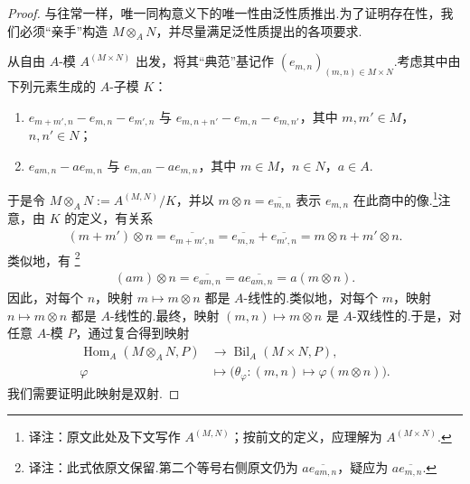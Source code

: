 \begin{proof}
与往常一样，唯一同构意义下的唯一性由泛性质推出.为了证明存在性，我们必须``亲手''构造 $M\otimes_A N$，并尽量满足泛性质提出的各项要求.

从自由 $A$-模 $A^{(M\times N)}$ 出发，将其``典范''基记作 $(e_{m,n})_{(m,n)\in M\times N}$.考虑其中由下列元素生成的 $A$-子模 $K$：
\begin{enumerate}
\item $e_{m+m',n}-e_{m,n}-e_{m',n}$ 与 $e_{m,n+n'}-e_{m,n}-e_{m,n'}$，其中 $m,m'\in M$，$n,n'\in N$；
\item $e_{am,n}-ae_{m,n}$ 与 $e_{m,an}-ae_{m,n}$，其中 $m\in M$，$n\in N$，$a\in A$.
\end{enumerate}
于是令 $M\otimes_A N:=A^{(M,N)}/K$，并以 $m\otimes n=\overline{e_{m,n}}$ 表示 $e_{m,n}$ 在此商中的像.\footnote{译注：原文此处及下文写作 $A^{(M,N)}$；按前文的定义，应理解为 $A^{(M\times N)}$.}注意，由 $K$ 的定义，有关系
\begin{align*}
(m+m')\otimes n=\overline{e_{m+m',n}}=\overline{e_{m,n}}+\overline{e_{m',n}}=m\otimes n+m'\otimes n.
\end{align*}
类似地，有
\footnote{译注：此式依原文保留.第二个等号右侧原文仍为 $a\overline{e_{am,n}}$，疑应为 $a\overline{e_{m,n}}$.}
\begin{align*}
(am)\otimes n=\overline{e_{am,n}}=a\overline{e_{am,n}}=a(m\otimes n).
\end{align*}
因此，对每个 $n$，映射 $m\mapsto m\otimes n$ 都是 $A$-线性的.类似地，对每个 $m$，映射 $n\mapsto m\otimes n$ 都是 $A$-线性的.最终，映射 $(m,n)\mapsto m\otimes n$ 是 $A$-双线性的.于是，对任意 $A$-模 $P$，通过复合得到映射
\begin{align*}
\operatorname{Hom}_A(M\otimes_A N,P)&\longrightarrow\operatorname{Bil}_A(M\times N,P),\\
\varphi&\longmapsto\bigl(\theta_\varphi:(m,n)\mapsto\varphi(m\otimes n)\bigr).
\end{align*}
我们需要证明此映射是双射.


\end{proof}
